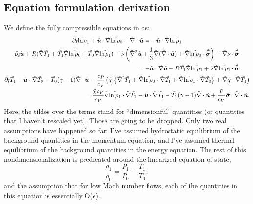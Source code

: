 \subsection{Equation formulation derivation}
We define the fully compressible equations in \citet{anders&brown2017} as:
\begin{gather}
\partial_{\tilde{t}} \tilde{\ln \rho_1} + \tilde{\bm{u}}\cdot\tilde{\nabla} \tilde{\ln\rho_0} + \tilde{\nabla}\cdot\tilde{\bm{u}} = -\tilde{\bm{u}}\cdot\tilde{\nabla}\tilde{\ln\rho_1} 
\label{eqn:unscaled_continuity}
\\
\begin{split}
\partial_{\tilde{t}} \tilde{\bm{u}} + R(\tilde{\nabla} \tilde{T_1} + \tilde{T_1} \tilde{\nabla}\tilde{\ln\rho_0} + \tilde{T_0} \tilde{\nabla}\tilde{\ln\rho_1})
- \tilde{\nu}\left(\tilde{\nabla}^2 \tilde{\bm{u}} + \frac{1}{3}\tilde{\nabla}(\tilde{\nabla}\cdot\tilde{\bm{u}}) + \tilde{\nabla}\tilde{\ln\rho_0}\cdot\tilde{\bm{\bar{\bar{\sigma}}}}\right)
- \tilde{\nabla}\tilde{\nu}\cdot\tilde{\bm{\bar{\bar{\sigma}}}}
\\= -\tilde{\bm{u}}\cdot\tilde{\nabla}\tilde{\bm{u}} - R\tilde{T_1}\tilde{\nabla}\tilde{\ln\rho_1} + \tilde{\nu}\tilde{\nabla}\tilde{\ln\rho_1}\cdot\tilde{\bm{\bar{\bar{\sigma}}}}
\end{split}
\label{eqn:unscaled_momentum}
\\
\begin{split}
\partial_{\tilde{t}} \tilde{T_1} + \tilde{\bm{u}}\cdot\tilde{\nabla} \tilde{T_0} + \tilde{T_0}(\gamma-1)\tilde{\nabla}\cdot\tilde{\bm{u}} 
- \frac{c_P}{c_V}\left(\tilde{\chi}\left\{\tilde{\nabla}^2 \tilde{T_1} + \tilde{\nabla}\tilde{\ln\rho_0} \cdot\tilde{\nabla} \tilde{T_1} + \tilde{\nabla}\tilde{\ln\rho_1}\cdot\tilde{\nabla} \tilde{T_0}\right\} 
+ \tilde{\nabla}\tilde{\chi}\cdot\tilde{\nabla} \tilde{T_1}\right)
\\= \frac{\tilde{\chi}c_P}{c_V}\tilde{\nabla}\tilde{\ln\rho_1}\cdot\tilde{\nabla} \tilde{T_1} - \tilde{\bm{u}}\cdot\tilde{\nabla} \tilde{T_1} - \tilde{T_1}(\gamma-1)\tilde{\nabla}\cdot\tilde{\bm{u}}
+ \frac{\tilde{\nu}}{c_V}\tilde{\bm{\bar{\bar{\sigma}}}}\cdot\tilde{\nabla}\cdot\tilde{\bm{u}}.
\end{split}
\label{eqn:unscaled_energy}
\end{gather}
Here, the tildes over the terms stand for ``dimensionful" quantities (or quantities that I haven't rescaled yet). 
Those are going to be dropped. 
Only two real assumptions have happened so far: I've assumed hydrostatic equilibrium of the background quantities in the momentum equation, and I've assumed thermal equilibrium of the background quantities in the energy equation.
The rest of this nondimensionalization is predicated around the linearized equation of state,
$$
\frac{\rho_1}{\rho_0} = \frac{P_1}{P_0} - \frac{T_1}{T_0},
$$
and the assumption that for low Mach number flows, each of the quantities in this equation is essentially O($\epsilon$).
